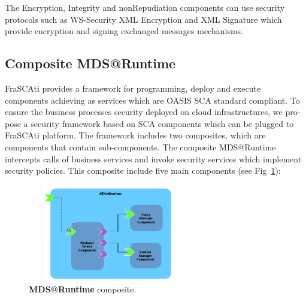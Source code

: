 \documentclass[runningheads,a4paper]{llncs}
\begin{document}
The Encryption, Integrity and nonRepudiation components can use security protocols such as WS-Security XML Encryption and XML Signature which provide encryption and signing  exchanged messages mechanisms.



\subsection{Composite MDS@Runtime}



FraSCAti provides a framework for programming, deploy and execute components achieving as services which are OASIS SCA standard compliant. To ensure the business processes security deployed on cloud infrastructures, we pro- pose a security framework based on SCA components which can be plugged to FraSCAti platform. The framework includes two composites, which are components that contain sub-components. The composite MDS@Runtime intercepts calls of business services and invoke security services which implement security policies. This composite include five main components (see Fig~\ref{fig:mdsAtRuntime}):

\begin{figure}[ht]  
\centering
\includegraphics[height=120pt, width=200pt]{mdsAtRuntimeComponent1.png}
\caption{\textbf{MDS@Runtime} composite.}
\label{fig:mdsAtRuntime}
\end{figure}
\end{document}
